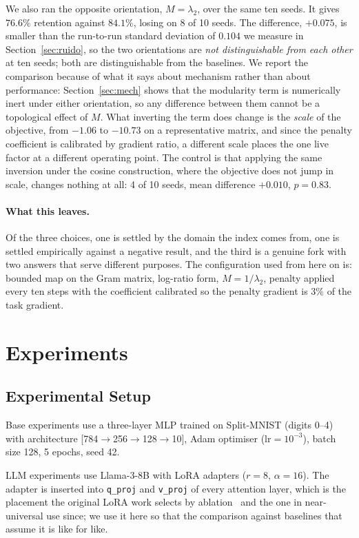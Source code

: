 \documentclass[11pt,a4paper]{article}
\begin{document}
We also ran the opposite orientation, $M = \lambda_2$, over the same ten seeds.
It gives $76.6\%$ retention against $84.1\%$, losing on 8 of 10 seeds. The
difference, $+0.075$, is smaller than the run-to-run standard deviation of
$0.104$ we measure in Section~\ref{sec:ruido}, so the two orientations are
\emph{not distinguishable from each other} at ten seeds; both are distinguishable
from the baselines. We report the comparison because of what it says about
mechanism rather than about performance: Section~\ref{sec:mech} shows that the
modularity term is numerically inert under either orientation, so any difference
between them cannot be a topological effect of $M$. What inverting the term does
change is the \emph{scale} of the objective, from $-1.06$ to $-10.73$ on a
representative matrix, and since the penalty coefficient is calibrated by
gradient ratio, a different scale places the one live factor at a different
operating point. The control is that applying the same inversion under the
cosine construction, where the objective does not jump in scale, changes nothing
at all: 4 of 10 seeds, mean difference $+0.010$, $p=0.83$.

\paragraph{What this leaves.} Of the three choices, one is settled by the domain
the index comes from, one is settled empirically against a negative result, and
the third is a genuine fork with two answers that serve different purposes. The
configuration used from here on is: bounded map on the Gram matrix, log-ratio
form, $M = 1/\lambda_2$, penalty applied every ten steps with the coefficient
calibrated so the penalty gradient is $3\%$ of the task gradient.

\section{Experiments}

\subsection{Experimental Setup}

Base experiments use a three-layer MLP trained on Split-MNIST (digits 0--4)
with architecture [784$\to$256$\to$128$\to$10], Adam optimiser
(lr$=10^{-3}$), batch size 128, 5 epochs, seed 42.

LLM experiments use Llama-3-8B \cite{meta2024} with LoRA adapters
($r{=}8$, $\alpha{=}16$). The adapter is inserted into \texttt{q\_proj} and
\texttt{v\_proj} of every attention layer, which is the placement the original
LoRA work selects by ablation~\cite{hu2022} and the one in near-universal use
since; we use it here so that the comparison against baselines that assume it
is like for like.
\end{document}
